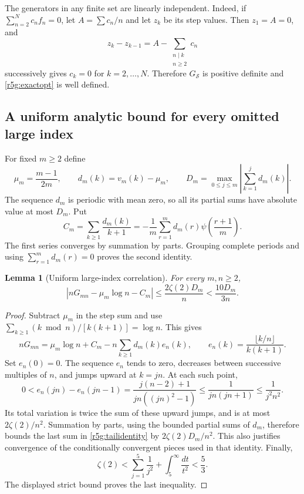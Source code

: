 \documentclass[11pt,a4paper]{article}
\newtheorem{lemma}[theorem]{Lemma}
\theoremstyle{definition}\newtheorem{definition}[theorem]{Definition}
\theoremstyle{remark}\newtheorem{remark}[theorem]{Remark}
\numberwithin{equation}{section}
\begin{document}
The generators in any finite set are linearly independent. Indeed,
if $\sum_{n=2}^Nc_nf_n=0$, let $A=\sum c_n/n$ and let $z_k$ be its
step values. Then $z_1=A=0$, and
\[
 z_k-z_{k-1}=A-\sum_{\substack{n\mid k\\n\ge2}}c_n
\]
successively gives $c_k=0$ for $k=2,\ldots,N$. Therefore
$G_{\mathcal S}$ is positive definite and \eqref{r5g:exactopt} is
well defined.

\subsection{A uniform analytic bound for every omitted large index}

For fixed $m\ge2$ define
\[
 \mu_m=\frac{m-1}{2m},\qquad d_m(k)=v_m(k)-\mu_m,
 \qquad
 D_m=\max_{0\le j\le m}\left|\sum_{k=1}^j d_m(k)\right|.
\]
The sequence $d_m$ is periodic with mean zero, so all its partial
sums have absolute value at most $D_m$. Put
\begin{equation}\label{r5g:C}
 C_m=\sum_{k\ge1}\frac{d_m(k)}{k+1}
 =-\frac1m\sum_{r=1}^{m}d_m(r)
                     \psi\left(\frac{r+1}{m}\right).
\end{equation}
The first series converges by summation by parts. Grouping complete
periods and using $\sum_{r=1}^md_m(r)=0$ proves the second identity.

\begin{lemma}[Uniform large-index correlation]\label{r5g:tail}
For every $m,n\ge2$,
\begin{equation}\label{r5g:tailbound}
 \left|nG_{mn}-\mu_m\log n-C_m\right|
 \le\frac{2\zeta(2)D_m}{n}<\frac{10D_m}{3n}.
\end{equation}
\end{lemma}
\begin{proof}
Subtract $\mu_m$ in the step sum and use
$\sum_{k\ge1}(k\bmod n)/[k(k+1)]=\log n$. This gives
\begin{equation}\label{r5g:tailidentity}
 nG_{mn}=\mu_m\log n+C_m
   -n\sum_{k\ge1}d_m(k)e_n(k),
 \qquad e_n(k)=\frac{\lfloor k/n\rfloor}{k(k+1)}.
\end{equation}
Set $e_n(0)=0$. The sequence $e_n$ tends to zero, decreases between
successive multiples of $n$, and jumps upward at $k=jn$.
At each such point,
\[
 0< e_n(jn)-e_n(jn-1)
 =\frac{j(n-2)+1}{jn((jn)^2-1)}
 \le\frac1{jn(jn+1)}\le\frac1{j^2n^2}.
\]
Its total variation is twice the sum of these upward jumps,
and is at most $2\zeta(2)/n^2$.
Summation by parts, using the bounded partial sums of $d_m$,
therefore bounds the last sum in \eqref{r5g:tailidentity} by
$2\zeta(2)D_m/n^2$. This also justifies convergence of the
conditionally convergent pieces used in that identity.
Finally,
\[
 \zeta(2)<\sum_{j=1}^{5}\frac1{j^2}
                       +\int_5^\infty\frac{dt}{t^2}<\frac53.
\]
The displayed strict bound proves the last inequality.
\end{proof}
\end{document}
